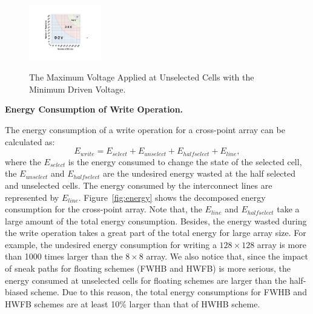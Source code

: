 \begin{figure}%
\centering
  \includegraphics[width=0.28\textwidth]{./figures/Theoretical_bound2.pdf}\\
  \caption{The Maximum Voltage Applied at Unselected Cells with the Minimum Driven Voltage.}\label{fig:half}
  \vspace{-10pt}
\end{figure}



\vspace{6pt} \textbf{Energy Consumption of Write Operation.} \vspace{6pt}

The energy consumption of a write operation for a cross-point array can be calculated as:
\begin{equation}
E_{write} = E_{select} + E_{unselect} + E_{halfselect} + E_{line},
\end{equation}
where the $E_{select}$ is the energy consumed to change the state of the
selected cell, the $E_{unselect}$ and $E_{halfselect}$ are the undesired energy wasted at the half selected and unselected cells. The energy consumed by the interconnect lines are represented by $E_{line}$. Figure~\ref{fig:energy} shows the decomposed energy consumption for the cross-point array. Note that, the $E_{line}$ and $E_{halfselect}$ take a large amount of the total energy consumption. Besides, the energy wasted during the write operation takes a great part of the total energy for large array size. For example, the undesired energy consumption for writing a $128{\times}128$ array is more than 1000 times larger than the $8{\times}8$ array. We also notice that, since the impact of sneak paths for floating schemes (FWHB and HWFB) is more serious, the energy consumed at unselected cells for floating schemes are larger than the half-biased scheme. Due to this reason, the total energy consumptions for FWHB and HWFB schemes are at least 10\% larger than that of HWHB scheme.


